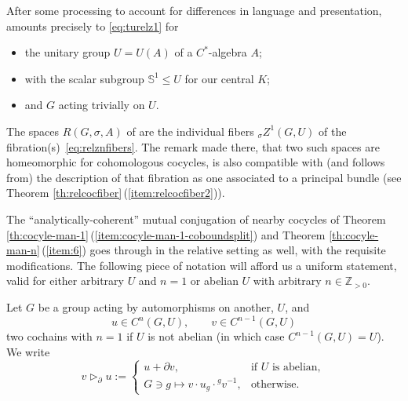 \documentclass[pdftex]{sigma}
\numberwithin{equation}{section}
\newcommand\bS{{\mathbb S}}
\newcommand\bZ{{\mathbb Z}}
\begin{document}
\begin{Remark}\label{re:martinsame}
 After some processing to account for differences in language and presentation, \cite[Proposition 2.2]{mart-proj} amounts precisely to \eqref{eq:turelz1} for
 \begin{itemize}\itemsep=0pt
 \item the unitary group $U=U(A)$ of a $C^*$-algebra $A$;
 \item with the scalar subgroup $\bS^1\le U$ for our central $K$;
 \item and $G$ acting trivially on $U$.
 \end{itemize}
 The spaces $R(G,\sigma,A)$ of \cite[Section~1.4]{mart-proj} are the individual fibers ${}_{\sigma}Z^1(G,U)$ of the fibration(s)~\eqref{eq:relznfibers}. The remark made there, that two such spaces are homeomorphic for cohomologous cocycles, is also compatible with (and follows from) the description of that fibration as one associated to a principal bundle (see Theorem \ref{th:relcocfiber}\,(\ref{item:relcocfiber2})).
\end{Remark}

The ``analytically-coherent'' mutual conjugation of nearby cocycles of Theorem \ref{th:cocyle-man-1}\,(\ref{item:cocyle-man-1-coboundsplit}) and Theorem \ref{th:cocyle-man-n}\,(\ref{item:6}) goes through in the relative setting as well, with the requisite modifications. The following piece of notation will afford us a uniform statement, valid for either arbitrary $U$ and $n=1$ or abelian $U$ with arbitrary $n\in \bZ_{>0}$.

\begin{Notation}\label{not:actpart}
 Let $G$ be a group acting by automorphisms on another, $U$, and
 \begin{equation*}
 u\in C^n(G,U),\qquad v\in C^{n-1}(G,U)
 \end{equation*}
 two cochains with $n=1$ if $U$ is not abelian \big(in which case $C^{n-1}(G,U)=U$\big). We write
 \begin{equation*}
 v\triangleright_{\partial} u:=
 \begin{cases}
 u+\partial v, &\text{if $U$ is abelian},\\
 G\ni g\mapsto v\cdot u_g \cdot {}^g v^{-1}, &\text{otherwise}.
 \end{cases}
 \end{equation*}
\end{Notation}
\end{document}
